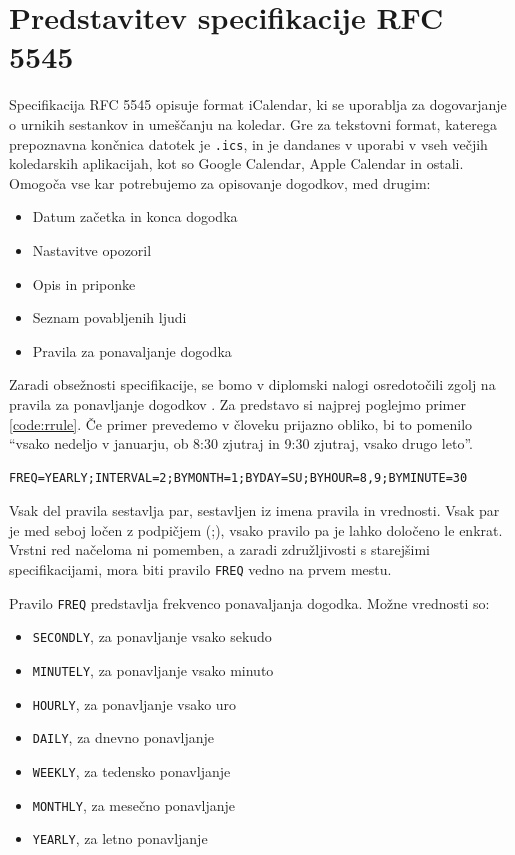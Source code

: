 \section{Predstavitev specifikacije RFC 5545}

Specifikacija RFC 5545\cite{rfc5545} opisuje format iCalendar, ki se uporablja za dogovarjanje o urnikih sestankov in umeščanju na koledar. Gre za tekstovni format, katerega prepoznavna končnica datotek je \texttt{.ics}, in je dandanes v uporabi v vseh večjih koledarskih aplikacijah, kot so Google Calendar, Apple Calendar in ostali. Omogoča vse kar potrebujemo za opisovanje dogodkov, med drugim:

\begin{itemize}
  \item Datum začetka in konca dogodka
  \item Nastavitve opozoril
  \item Opis in priponke
  \item Seznam povabljenih ljudi
  \item Pravila za ponavaljanje dogodka
\end{itemize}

Zaradi obsežnosti specifikacije, se bomo v diplomski nalogi osredotočili zgolj na pravila za ponavljanje dogodkov \cite{rrule}. Za predstavo si najprej poglejmo primer \ref{code:rrule}. Če primer prevedemo v človeku prijazno obliko, bi to pomenilo ``vsako nedeljo v januarju, ob 8:30 zjutraj in 9:30 zjutraj, vsako drugo leto''.

\begin{lstlisting}[caption=Primer uporabe pravila RRULE spefikiacije RFC 5545., label=code:rrule]
FREQ=YEARLY;INTERVAL=2;BYMONTH=1;BYDAY=SU;BYHOUR=8,9;BYMINUTE=30
\end{lstlisting}

Vsak del pravila sestavlja par, sestavljen iz imena pravila in vrednosti. Vsak par je med seboj ločen z podpičjem (;), vsako pravilo pa je lahko določeno le enkrat. Vrstni red načeloma ni pomemben, a zaradi združljivosti s starejšimi specifikacijami, mora biti pravilo \texttt{FREQ} vedno na prvem mestu.

Pravilo \texttt{FREQ} predstavlja frekvenco ponavaljanja dogodka. Možne vrednosti so:

\begin{itemize}
  \item \texttt{SECONDLY}, za ponavljanje vsako sekudo
  \item \texttt{MINUTELY}, za ponavljanje vsako minuto
  \item \texttt{HOURLY}, za ponavljanje vsako uro
  \item \texttt{DAILY}, za dnevno ponavljanje
  \item \texttt{WEEKLY}, za tedensko ponavljanje
  \item \texttt{MONTHLY}, za mesečno ponavljanje
  \item \texttt{YEARLY}, za letno ponavljanje
\end{itemize}


